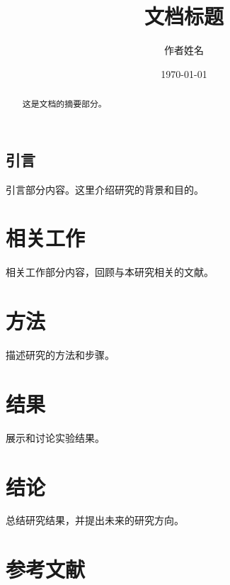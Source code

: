 \documentclass{article}
\title{文档标题}
\author{作者姓名}
\date{\today}
\begin{document}
\maketitle

\begin{abstract}
这是文档的摘要部分。
\end{abstract}

\tableofcontents %

\subsection{引言}
引言部分内容。这里介绍研究的背景和目的。

\section{相关工作}
相关工作部分内容，回顾与本研究相关的文献。

\section{方法}
描述研究的方法和步骤。

\section{结果}
展示和讨论实验结果。

\section{结论}
总结研究结果，并提出未来的研究方向。

\section*{参考文献} %
\end{document}
